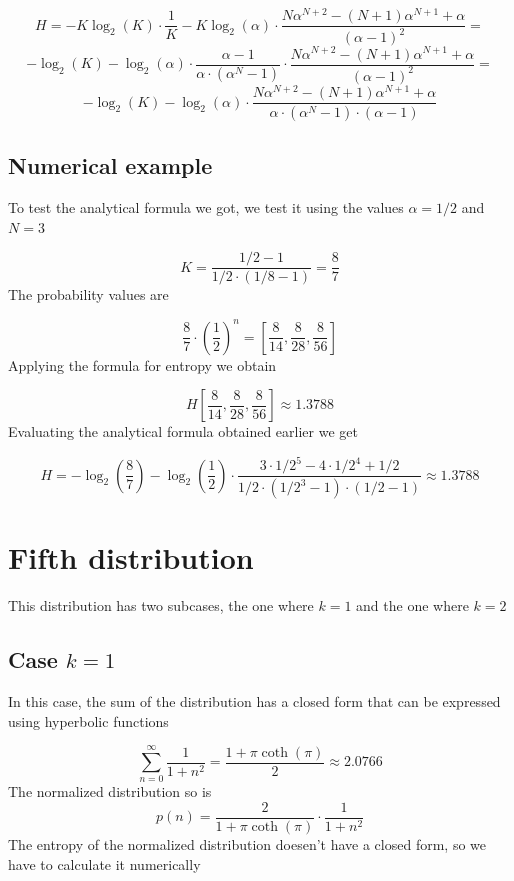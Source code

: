 \[ 
	H = - K \log_2(K) \cdot \frac{1}{K}
	- K \log_2(\alpha) \cdot
	\frac{N\alpha^{N+2} - (N+1)\alpha^{N+1} + \alpha}
	{(\alpha - 1)^2} =
\]
\[ 
	- \log_2(K) - \log_2(\alpha) \cdot
	\frac{\alpha - 1}{\alpha \cdot (\alpha^N - 1)} \cdot
	\frac{N\alpha^{N+2} - (N+1)\alpha^{N+1} + \alpha}
	{(\alpha - 1)^2} = 
\]
\[ 
	- \log_2(K) - \log_2(\alpha) \cdot
	\frac{N\alpha^{N+2} - (N+1)\alpha^{N+1} + \alpha}
	{\alpha \cdot (\alpha^N - 1) \cdot (\alpha - 1)}
\]

\subsection{Numerical example}

To test the analytical formula we got, we test it using the values $\alpha = 1/2$ and $N=3$

\[ 
	K = \frac{1/2 - 1}{1/2 \cdot (1/8 - 1)} = \frac{8}{7}
\]
The probability values are

\[
	\frac{8}{7} \cdot \left(
	\frac{1}{2} \right)^n =
	 \left[
	 	\frac{8}{14},
	 	\frac{8}{28},
	 	\frac{8}{56}
	 \right]
\]
Applying the formula for entropy we obtain

\[ 
	H
	\left[
	\frac{8}{14},
	\frac{8}{28},
	\frac{8}{56}
	\right] \approx 1.3788
\]
Evaluating the analytical formula obtained earlier we get

\[ 
	H = - \log_2\left(\frac{8}{7}\right)
	- \log_2\left(\frac{1}{2}\right) \cdot
	\frac{3 \cdot 1/2^5 - 4 \cdot 1/2^4 + 1/2}
	{1/2 \cdot (1/2^3 - 1) \cdot (1/2 - 1)}
	\approx 1.3788
\]

\section{Fifth distribution}

This distribution has two subcases, the one where $k = 1$ and the one where $k = 2$

\subsection{Case $k=1$}
In this case, the sum of the distribution has a closed form that can be expressed using hyperbolic functions

\[ 
	\sum_{n=0}^{\infty} \frac{1}{1 + n^2} = 
	\frac{1 + \pi \coth(\pi)}{2}
	\approx 2.0766
\]
The normalized distribution so is 
\[ 
	p(n) = \frac{2}{1 + \pi \coth(\pi)} \cdot
		\frac{1}{1 + n^2}
\]
The entropy of the normalized distribution doesen't have a closed form, so we have to calculate it numerically

